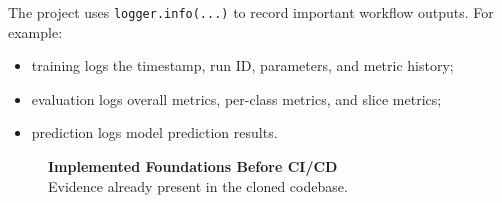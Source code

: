 \documentclass[11pt,a4paper]{article}
\begin{document}
The project uses \texttt{logger.info(...)} to record important workflow outputs. For example:

\begin{itemize}
    \item training logs the timestamp, run ID, parameters, and metric history;
    \item evaluation logs overall metrics, per-class metrics, and slice metrics;
    \item prediction logs model prediction results.
\end{itemize}

\begin{figure}[H]
    \centering
    \begin{tcolorbox}[
        enhanced,
        width=0.96\textwidth,
        colback=soft,
        colframe=soft,
        boxrule=0pt,
        arc=1mm,
        left=7mm,
        right=7mm,
        top=6mm,
        bottom=7mm
    ]
        {\Large\bfseries\color{navy} Implemented Foundations Before CI/CD}\\[0.15cm]
        {\small\color{slate} Evidence already present in the cloned codebase.}\\[0.8cm]


\end{tcolorbox}
\end{figure}
\end{document}
